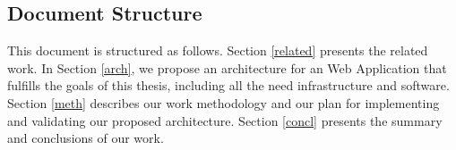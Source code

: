 
\subsection{Document Structure} %
This document is structured as follows. Section \ref{related} presents the related work.
	In Section \ref{arch}, we propose an architecture for an Web Application that fulfills the goals of this thesis, including all the need infrastructure and software.
	Section \ref{meth} describes our work methodology and our plan for implementing and validating our proposed architecture.
	Section \ref{concl} presents the summary and conclusions of our work.

